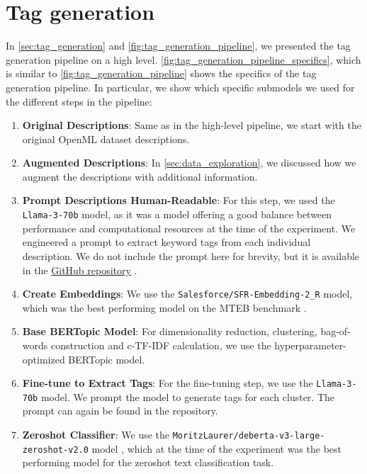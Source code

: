 \section{Tag generation}
In \cref{sec:tag_generation} and \cref{fig:tag_generation_pipeline}, we presented the tag generation pipeline on a high level. \cref{fig:tag_generation_pipeline_specifics}, which is similar to \cref{fig:tag_generation_pipeline} shows the specifics of the tag generation pipeline. In particular, we show which specific submodels we used for the different steps in the pipeline:
\begin{enumerate}
    \item \textbf{Original Descriptions}: Same as in the high-level pipeline, we start with the original OpenML dataset descriptions.
    \item \textbf{Augmented Descriptions}: In \cref{sec:data_exploration}, we discussed how we augment the descriptions with additional information.
    \item \textbf{Prompt Descriptions Human-Readable}: For this step, we used the \texttt{Llama-3-70b} model, as it was a model offering a good balance between performance and computational resources at the time of the experiment. We engineered a prompt to extract keyword tags from each individual description. We do not include the prompt here for brevity, but it is available in the \href{https://github.com/ivangermanov/openml-tags}{GitHub repository} \cite{germanov_topic_modeling_of_2024}.
    \item \textbf{Create Embeddings}: We use the \texttt{Salesforce/SFR-Embedding-2\_R} model, which was the best performing model on the MTEB benchmark \cite{muennighoff_mteb_2023}.
    \item \textbf{Base BERTopic Model}: For dimensionality reduction, clustering, bag-of-words construction and c-TF-IDF calculation, we use the hyperparameter-optimized BERTopic model.
    \item \textbf{Fine-tune to Extract Tags}: For the fine-tuning step, we use the \texttt{Llama-3-70b} model. We prompt the model to generate tags for each cluster. The prompt can again be found in the repository.
    \item \textbf{Zeroshot Classifier}: We use the \texttt{MoritzLaurer/deberta-v3-large-zeroshot-v2.0} model \cite{noauthor_moritzlaurerdeberta-v3-large-zeroshot-v20_2024}, which at the time of the experiment was the best performing model for the zeroshot text classification task.
\end{enumerate}

